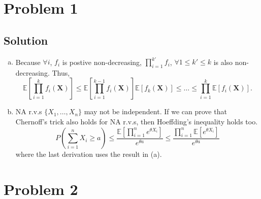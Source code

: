 \documentclass[11pt]{report}
\newcommand{\vect}[1]{\boldsymbol{\mathbf{#1}}}
\newcommand{\E}[1]{\mathbb{E}\left[#1\right]}
\begin{document}

\section*{Problem 1}
\subsection*{Solution}
\begin{enumerate}[(a)]
  \item Because $\forall i$, $f_i$ is postive non-decreasing, $\prod_{i=1}^{k'} f_i$, $\forall 1 \leq k' \leq k$ is also non-decreasing. Thus,
  \[
  \E{\prod_{i=1}^{k} f_i(\vect{X})} \leq \E{\prod_{i=1}^{k-1} f_i(\vect{X})} \E{f_k(\vect{X})} \leq \dots \leq \prod_{i=1}^{k}\E{f_i(\vect{X})}.
  \]
  \item NA r.v.s $\{X_1, \dots, X_n\}$ may not be independent. If we can prove that Chernoff's trick also holds for NA r.v.s, then Hoeffding's inequality holds too.
  \[
    P(\sum_{i=1}^{n} X_i \geq a) \leq \frac{\E{\prod_{i=1}^{n} e^{\theta X_i}}}{e^{\theta a}} \leq \frac{\prod_{i=1}^{n} \E{e^{\theta X_i}}}{e^{\theta a}}
  \]
  where the last derivation uses the result in (a).
\end{enumerate}
\section*{Problem 2}
\end{document}
